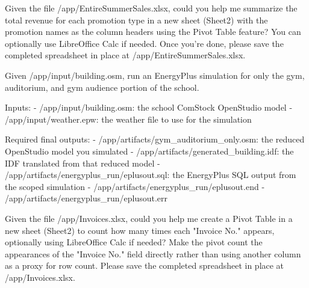 \documentclass{llmxive}
\begin{document}
\begin{instructionbox}
Given the file \textasciigrave{}/app/EntireSummerSales.xlsx\textasciigrave{}, could you help me summarize the total revenue for each promotion type in a new sheet (Sheet2) with the promotion names as the column headers using the Pivot Table feature? You can optionally use LibreOffice Calc if needed. Once you're done, please save the completed spreadsheet in place at \textasciigrave{}/app/EntireSummerSales.xlsx\textasciigrave{}.
\end{instructionbox}

\begin{instructionbox}
Given \textasciigrave{}/app/input/building.osm\textasciigrave{}, run an EnergyPlus simulation for only the gym, auditorium, and gym audience portion of the school.

Inputs:
- \textasciigrave{}/app/input/building.osm\textasciigrave{}: the school ComStock OpenStudio model
- \textasciigrave{}/app/input/weather.epw\textasciigrave{}: the weather file to use for the simulation

Required final outputs:
- \textasciigrave{}/app/artifacts/gym\_auditorium\_only.osm\textasciigrave{}: the reduced OpenStudio model you simulated
- \textasciigrave{}/app/artifacts/generated\_building.idf\textasciigrave{}: the IDF translated from that reduced model
- \textasciigrave{}/app/artifacts/energyplus\_run/eplusout.sql\textasciigrave{}: the EnergyPlus SQL output from the scoped simulation
- \textasciigrave{}/app/artifacts/energyplus\_run/eplusout.end\textasciigrave{}
- \textasciigrave{}/app/artifacts/energyplus\_run/eplusout.err\textasciigrave{}
\end{instructionbox}

\begin{instructionbox}
Given the file \textasciigrave{}/app/Invoices.xlsx\textasciigrave{}, could you help me create a Pivot Table in a new sheet (Sheet2) to count how many times each "Invoice No." appears, optionally using LibreOffice Calc if needed? Make the pivot count the appearances of the "Invoice No." field directly rather than using another column as a proxy for row count. Please save the completed spreadsheet in place at \textasciigrave{}/app/Invoices.xlsx\textasciigrave{}.
\end{instructionbox}
\end{document}
